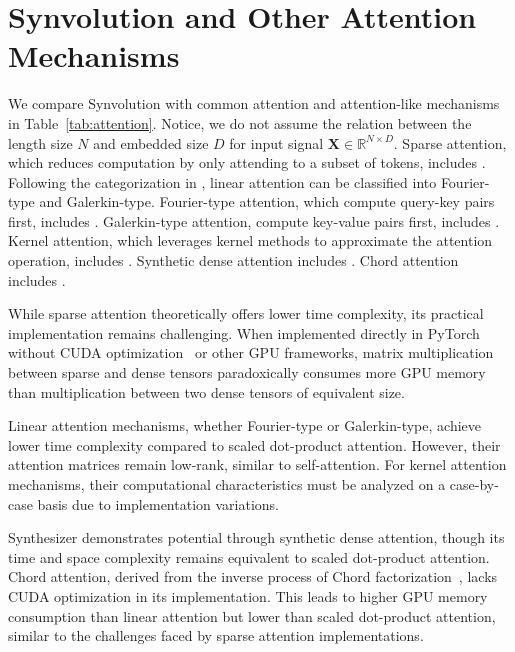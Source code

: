 \section{Synvolution and Other Attention Mechanisms}
We compare Synvolution with common attention and attention-like mechanisms in Table~\ref{tab:attention}. Notice, we do not assume the relation between the length size $N$ and embedded size $D$ for input signal $\mathbf{X} \in \mathbb{R}^{N \times D}$. Sparse attention, which reduces computation by only attending to a subset of tokens, includes \citep{child2019generating,NEURIPS2020_c8512d14}. Following the categorization in \citep{cao2021choose}, linear attention can be classified into Fourier-type and Galerkin-type. Fourier-type attention, which compute query-key pairs first, includes \citep{Shen_2021_WACV,cao2021choose,zhang-etal-2021-sparse,Koohpayegani_2024_WACV}. Galerkin-type attention, compute key-value pairs first, includes \citep{pmlr-v119-katharopoulos20a,cao2021choose,Koohpayegani_2024_WACV}. Kernel attention, which leverages kernel methods to approximate the attention operation, includes \citep{tsai-etal-2019-transformer,choromanski2021rethinking,NEURIPS2021_10a7cdd9,xiong2021Nystromformer}. Synthetic dense attention includes \citep{pmlr-v139-tay21a}. Chord attention includes \citep{9878955}. 

While sparse attention theoretically offers lower time complexity, its practical implementation remains challenging. When implemented directly in PyTorch without CUDA optimization~\citep{10.1145/1365490.1365500} or other GPU frameworks, matrix multiplication between sparse and dense tensors paradoxically consumes more GPU memory than multiplication between two dense tensors of equivalent size.

Linear attention mechanisms, whether Fourier-type or Galerkin-type, achieve lower time complexity compared to scaled dot-product attention. However, their attention matrices remain low-rank, similar to self-attention. For kernel attention mechanisms, their computational characteristics must be analyzed on a case-by-case basis due to implementation variations.

Synthesizer demonstrates potential through synthetic dense attention, though its time and space complexity remains equivalent to scaled dot-product attention. Chord attention, derived from the inverse process of Chord factorization~\citep{KHALITOV2022160}, lacks CUDA optimization in its implementation. This leads to higher GPU memory consumption than linear attention but lower than scaled dot-product attention, similar to the challenges faced by sparse attention implementations.

